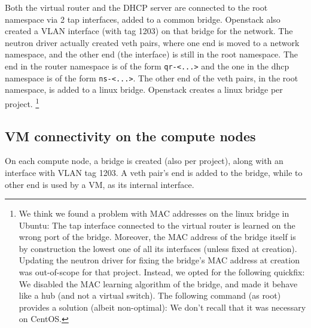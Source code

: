 Both the virtual router and the DHCP server are connected to the root
namespace via 2 tap interfaces, added to a common bridge. Openstack
also created a VLAN interface (with tag 1203) on that bridge for the
 network.
%
The neutron driver actually created veth pairs, where one end is moved
to a network namespace, and the other end (the 
interface) is still in the root namespace. The end in the router
namespace is of the form \texttt{qr-\textless{}...\textgreater{}} and
the one in the dhcp namespace is of the form
\texttt{ns-\textless{}...\textgreater{}}. The other end of the veth
pairs, in the root namespace, is added to a linux bridge. Openstack
creates a linux bridge per project.%
\footnote{%
  We think we found a problem with MAC addresses on the linux bridge
  in Ubuntu: The tap interface connected to the virtual router is
  learned on the wrong port of the bridge. Moreover, the MAC address
  of the bridge itself is by construction the lowest one of all its
  interfaces (unless fixed at creation). Updating the neutron driver
  for fixing the bridge's MAC address at creation was out-of-scope for
  that project. Instead, we opted for the following quickfix: We
  disabled the MAC learning algorithm of the bridge, and made it
  behave like a hub (and not a virtual switch).
  The following command (as root) provides a solution (albeit
  non-optimal): 
  We don't recall that it was necessary on CentOS. 
}
%



\subsection{VM connectivity on the compute nodes}
\label{section:implementation:compute:nodes}

On each compute node, a bridge is created (also per project), along
with an interface with VLAN tag 1203. A veth pair's end is added to
the bridge, while to other end is used by a VM, as its internal
interface.

